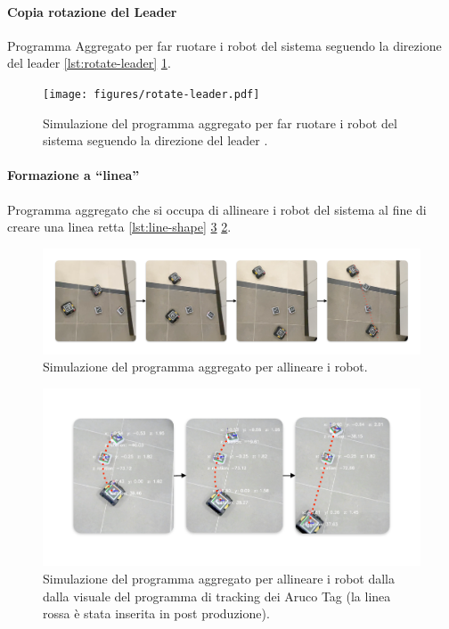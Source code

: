 \documentclass[12pt,a4paper,openright,twoside]{book}
\begin{document}
\paragraph{Copia rotazione del Leader}
Programma Aggregato per far ruotare i robot del sistema seguendo la direzione del leader \cref{lst:rotate-leader} \cref{fig:rotate-leader}.



\begin{figure}
    \centering
    \texttt{[image: figures/rotate-leader.pdf]}
    \caption{Simulazione del programma aggregato per far ruotare i robot del sistema seguendo la direzione del leader .}
    \label{fig:rotate-leader}
\end{figure}

\paragraph{Formazione a ``linea''}
Programma aggregato che si occupa di allineare i robot del sistema al fine di creare una linea retta \cref{lst:line-shape} \cref{fig:line-shape-1} \cref{fig:line-shape-2}.

% 

\begin{figure}
    \centering
    \includegraphics[width=.99\linewidth]{figures/line2.pdf}
    \caption{Simulazione del programma aggregato per allineare i robot.}
    \label{fig:line-shape-2}
\end{figure}

\begin{figure}
    \centering
    \includegraphics[width=.99\linewidth]{figures/line1.pdf}
    \caption{Simulazione del programma aggregato per allineare i robot dalla dalla visuale del programma di tracking dei Aruco Tag (la linea rossa è  stata inserita in post produzione).}
    \label{fig:line-shape-1}
\end{figure}
\end{document}
